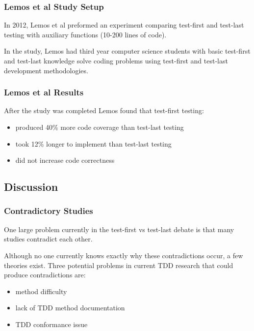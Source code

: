 \documentclass{beamer}
\newcommand{\linespace}{\vskip 0.25cm}
\begin{document}
\begin{frame}
\frametitle{Lemos et al Study Setup}
In 2012, Lemos et al preformed an experiment comparing test-first and test-last testing with auxiliary functions (10-200 lines of code).

\linespace

In the study, Lemos had third year computer science students with basic test-first and test-last knowledge solve coding problems using test-first and test-last development methodologies.

\linespace
\end{frame}

\begin{frame}
\frametitle{Lemos et al Results}
After the study was completed Lemos found that test-first testing:
	\begin{itemize}
	\linespace
		\item produced 40\% more code coverage than test-last testing
	\linespace
		\item took 12\% longer to implement than test-last testing
	\linespace 
		\item did not increase code correctness
	\end{itemize}
\end{frame}

\subsection{Discussion}

\begin{frame}
\frametitle{Contradictory Studies}
One large problem currently in the test-first vs test-last debate is that many studies contradict each other.

\linespace

Although no one currently knows exactly why these contradictions occur, a few theories exist.  Three potential problems in current TDD research that could produce contradictions are:
\begin{itemize}
\item method difficulty
\item lack of TDD method documentation
\item TDD conformance issue
\end{itemize}
\end{frame}
\end{document}
